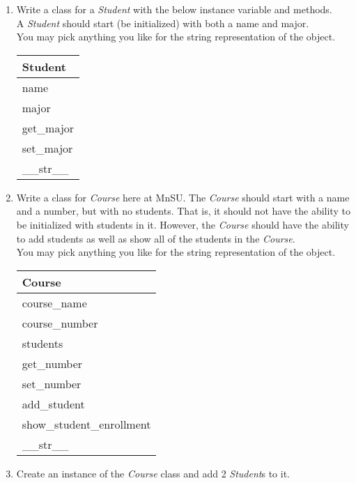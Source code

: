 



	\item 
	\begin{enumerate}
		\item 
			Write a class for a \textit{Student} with the below instance variable and methods.\\
			A \textit{Student} should start (be initialized) with both a name and major.\\
			You may pick anything you like for the string representation of the object.
			\begin{flushright}
			\begin{tabular}{|l|} \hline
				Student\\ \hline
				name\\ major\\ \hline
				get\_major\\ set\_major\\ \_\_str\_\_ \\ \hline
			\end{tabular}
			\end{flushright}
		
		\item 
			Write a class for \textit{Course} here at MnSU.  The \textit{Course} should start 
			with a name and a number, but with no students. That is, it should 
			not have the ability to be initialized with students in it. However, the 
			\textit{Course} should have the ability to add students as well as show all of the
			students in the \textit{Course}.\\
			You may pick anything you like for the string representation of the object.
			\begin{flushright}
			\begin{tabular}{|l|} \hline 
				Course\\ \hline
				course\_name\\ course\_number\\ students\\ \hline
				get\_number\\ set\_number\\ add\_student\\ show\_student\_enrollment\\ 
					\_\_str\_\_ \\ \hline
			\end{tabular}
			\end{flushright}

		\item
			Create an instance of the \textit{Course} class and add 2 \textit{Student}s to it.
	\end{enumerate}
\pagebreak




